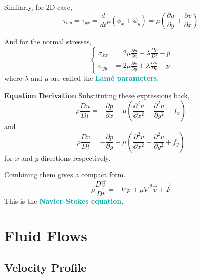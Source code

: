 \documentclass[twoside]{article}
\newcommand{\derivation}[1]{\begin{derivationbox} \emoji{pineapple} \textbf{Equation Derivation} \newline #1 \end{derivationbox}}
\newcommand{\highlightbluetext}[1]{\textcolor[HTML]{09ACA6}{\textbf{#1}}}
\numberwithin{equation}{section}
\begin{document}
{		Similarly, for 2D case,
		\begin{equation*}
			\tau_{xy} = \tau_{yx} = \frac{d}{dt} \mu (\phi_x+\phi_y) = \mu \left( \frac{\partial u}{\partial y}+\frac{\partial v}{\partial x} \right)
		\end{equation*}
		
		And for the normal stresses,
		\begin{equation*}
			\begin{cases}
				\sigma_{xx} &= 2\mu \frac{\partial u}{\partial x}+\lambda \frac{D\rho}{Dt}-p \\
				\sigma_{yy} &= 2\mu \frac{\partial v}{\partial y}+\lambda \frac{D\rho}{Dt}-p
			\end{cases}
		\end{equation*}
		where $\lambda$ and $\mu$ are called the \highlightbluetext{Lamé parameters}.
	}
	
	\newpage
	
	\derivation{
		Substituting these expressions back,
		\begin{equation*}
				\rho \frac{Du}{Dt} = -\frac{\partial p}{\partial x}+\mu \left( \frac{\partial^2 u}{\partial x^2}+\frac{\partial^2 u}{\partial y^2}+f_x \right)
		\end{equation*}
		and
		\begin{equation*}
			\rho \frac{Dv}{Dt} = -\frac{\partial p}{\partial y}+\mu \left( \frac{\partial^2 v}{\partial x^2}+\frac{\partial^2 v}{\partial y^2}+f_y \right)
		\end{equation*}
		for $x$ and $y$ directions respectively.
		
		Combining them gives a compact form.
		\begin{equation}
			\rho \frac{D\vec{v}}{Dt} = -\nabla p+\mu \nabla^2 \vec{v}+\vec{F}
		\end{equation}
		This is the \highlightbluetext{Navier-Stokes equation}.
	}
	
	\newpage
	
	\section{Fluid Flows}
	\label{sec:FluidFlows}
	
	\subsection{Velocity Profile}
	\label{subsec:VelocityProfile}
	
\end{document}
